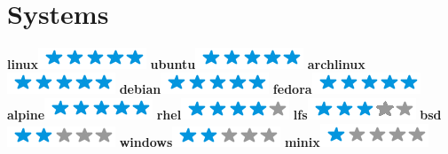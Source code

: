 \documentclass[]{friggeri-cv}
\begin{document}
\begin{aside}
~
~
~
    \section{Systems}
        \textbf{linux}\includegraphics[scale=0.40]{img/5stars.png}
        \textbf{ubuntu}\includegraphics[scale=0.40]{img/5stars.png}
        \textbf{archlinux}\includegraphics[scale=0.40]{img/5stars.png}
        \textbf{debian}\includegraphics[scale=0.40]{img/5stars.png}
        \textbf{fedora}\includegraphics[scale=0.40]{img/5stars.png}
        \textbf{alpine}\includegraphics[scale=0.40]{img/5stars.png}
        \textbf{rhel}\includegraphics[scale=0.40]{img/4stars.png}
        \textbf{lfs}\includegraphics[scale=0.40]{img/3stars.png}
        \textbf{bsd}\includegraphics[scale=0.40]{img/2stars.png}
        \textbf{windows}\includegraphics[scale=0.40]{img/2stars.png}
        \textbf{minix}\includegraphics[scale=0.40]{img/1stars.png}
        ~

\end{aside}
\end{document}

